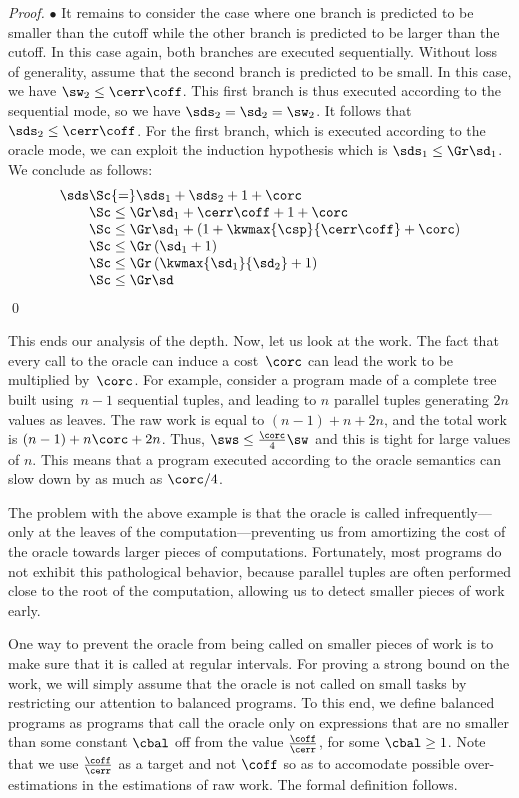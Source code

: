 \begin{proof}
$\bullet$  It remains to consider the case where one branch is predicted
to be smaller than the cutoff while the other branch is 
predicted to be larger than the cutoff.
In this case again, both branches are executed sequentially.
Without loss of generality, assume that the second branch is predicted
to be small. In this case, we have $\sw_2 \leq \cerr\coff$.
This first branch is thus executed according
to the sequential mode, so we have $\sds_2 = \sd_2 = \sw_2$. 
It follows that $\sds_2 \leq \cerr\coff$.
For the first branch, which is executed according to the oracle mode,
we can exploit the induction hypothesis which is $\sds_1 \leq \cspp\sd_1$.
We conclude as follows:
%
$$\begin{array}{l@{}l}
\sds & \Sc{=} \sds_1 + \sds_2 + 1 + \corc \\
& \Sc\leq \cspp\sd_1 + \cerr\coff + 1 + \corc\\
& \Sc\leq  \cspp\sd_1 + (1+\kwmax{\csp}{\cerr\coff}+\corc) \\
& \Sc\leq  \cspp \, (\sd_1 + 1) \\
& \Sc\leq  \cspp \,(\kwmax{ \sd_1 }{ \sd_2 } + 1) \\
& \Sc\leq  \cspp \sd
\end{array}$$
\qed
\end{proof}

This ends our analysis of the depth. Now, let us look at the work.
The fact that every call to the oracle can induce a cost~$\corc$ can
lead the work to be multiplied by~$\corc$.  For example, consider a
program made of a complete tree built using~$n-1$ sequential tuples,
and leading to $n$ parallel tuples generating $2n$ values as leaves.
The raw work is equal to $(n-1)+n+2n$, and the total work is
$(n-1)+n\corc+2n$.  Thus, $\sws \le \frac{\corc}{4} \sw$ and this is
tight for large values of $n$.  This means that a program executed
according to the oracle semantics can slow down by as much as
$\corc/4$.

The problem with the above example is that the oracle is called
infrequently---only at the leaves of the computation---preventing us
from amortizing the cost of the oracle towards larger pieces of
computations.  Fortunately, most programs do not exhibit this
pathological behavior, because parallel tuples are often performed
close to the root of the computation, allowing us to detect 
smaller pieces of work early. 

One way to prevent the oracle from being
called on smaller pieces of work is to make sure that it is called at
regular intervals.  For proving a strong bound on the
work, we will simply assume that the oracle is not called on small
tasks by restricting our attention to balanced programs. 
To this end, we define balanced programs as programs 
that call the oracle only on expressions that are no smaller 
than some constant $\cbal$ off from the value $\frac{\coff}{\cerr}$,
for some $\cbal \geq 1$. Note that we use $\frac{\coff}{\cerr}$ as
a target and not $\coff$ so as to accomodate possible over-estimations
in the estimations of raw work.
The formal definition follows.

